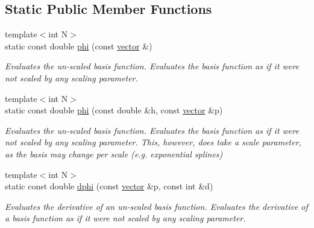 \subsection*{Static Public Member Functions}
\begin{DoxyCompactItemize}
\item 
\mbox{\label{classsisl_1_1nearest__neighbor_a14896b09eaa15503259f77e37e49cb6a}} 
{\footnotesize template$<$int N$>$ }\\static const double \hyperlink{classsisl_1_1nearest__neighbor_a14896b09eaa15503259f77e37e49cb6a}{phi} (const \hyperlink{namespacesisl_a2069bd5374a9be042ff3ce3306d41e1a}{vector} \&)
\begin{DoxyCompactList}\small\item\em Evaluates the un-\/scaled basis function. Evaluates the basis function as if it were not scaled by any scaling parameter. \end{DoxyCompactList}\item 
\mbox{\label{classsisl_1_1nearest__neighbor_aced35f861bd3310d2e171fb63a6144b8}} 
{\footnotesize template$<$int N$>$ }\\static const double \hyperlink{classsisl_1_1nearest__neighbor_aced35f861bd3310d2e171fb63a6144b8}{phi} (const double \&h, const \hyperlink{namespacesisl_a2069bd5374a9be042ff3ce3306d41e1a}{vector} \&p)
\begin{DoxyCompactList}\small\item\em Evaluates the un-\/scaled basis function. Evaluates the basis function as if it were not scaled by any scaling parameter. This, however, does take a scale parameter, as the basis may change per scale (e.\+g. exponential splines) \end{DoxyCompactList}\item 
\mbox{\label{classsisl_1_1nearest__neighbor_a52533a8b0e380490bbaac09f2d3292bc}} 
{\footnotesize template$<$int N$>$ }\\static const double \hyperlink{classsisl_1_1nearest__neighbor_a52533a8b0e380490bbaac09f2d3292bc}{dphi} (const \hyperlink{namespacesisl_a2069bd5374a9be042ff3ce3306d41e1a}{vector} \&p, const int \&d)
\begin{DoxyCompactList}\small\item\em Evaluates the derivative of an un-\/scaled basis function. Evaluates the derivative of a basis function as if it were not scaled by any scaling parameter. \end{DoxyCompactList}\item 

\end{DoxyCompactItemize}
